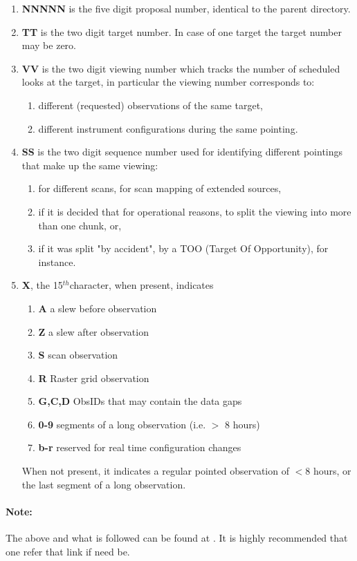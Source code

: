 \documentclass[a4paper,twoside]{report}
\numberwithin{equation}{section}
\newcommand{\pth}{$^{th}$}
\begin{document}
\begin{enumerate}
\item \textbf{NNNNN} is the five digit proposal number, identical to the parent directory.
\item \textbf{TT} is the two digit target number. In case of one target the target number may be zero.
\item {\textbf{VV} is the two digit viewing number which tracks the number of scheduled looks at the target, in particular the viewing number corresponds to:
\begin{enumerate}
\item different (requested) observations of the same target,
\item different instrument configurations during the same pointing.
\end{enumerate}}
\item {\textbf{SS} is the two digit sequence number used for identifying different pointings that make up the same viewing:
\begin{enumerate}
\item for different scans, for scan mapping of extended sources,
\item if it is decided that for operational reasons, to split the viewing into more than one chunk, or,
\item if it was split "by accident",  by a TOO (Target Of Opportunity), for instance. 
\end{enumerate}
}
\item {\textbf{X}, the 15\pth character, when present, indicates
\begin{enumerate}
\item \textbf{A} a slew before observation
\item \textbf{Z} a slew after observation
\item \textbf{S} scan observation
\item \textbf{R} Raster grid observation
\item \textbf{G,C,D} ObsIDs that may contain the data gaps
\item \textbf{0-9} segments of a long observation (i.e. $>$ 8 hours)
\item \textbf{b-r} reserved for real time configuration changes
\end{enumerate}
When not present, it indicates a regular pointed observation of $<$8 hours, or the last segment of a long observation. 
}
\end{enumerate}
\paragraph{Note:}The above and what is followed can be found at \cite{RXTEG1}. It is highly recommended that one refer that link if need be.
\end{document}
